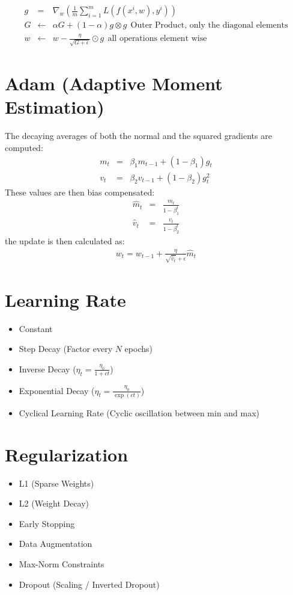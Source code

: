 \begin{eqnarray}
    g &=& \nabla_w \left( \frac{1}{m} \sum_{i=1}^m L(f(x^i, w), y^i) \right) \\
    G &\leftarrow& \alpha G + (1-\alpha) g \otimes g\ \ \text{Outer Product, only the diagonal elements} \\
    w &\leftarrow& w - \frac{\eta}{\sqrt{G + \epsilon}} \odot g\ \ \text{all operations element wise}
\end{eqnarray}

\section{Adam (Adaptive Moment Estimation)}
The decaying averages of both the normal and the squared gradients are computed:
\begin{eqnarray}
    m_t &=& \beta_1 m_{t-1} + (1- \beta_1) g_t \\
    v_t &=& \beta_2 v_{t-1} + (1- \beta_2) g_t^2
\end{eqnarray}
These values are then bias compensated:
\begin{eqnarray}
    \hat{m}_t &=& \frac{m_t}{1-\beta_1^t} \\
    \hat{v}_t &=& \frac{v_t}{1-\beta_2^t}
\end{eqnarray}
the update is then calculated as:
\begin{eqnarray}
    w_t = w_{t-1} + \frac{\eta}{\sqrt{\hat{v}_t} + \epsilon} \hat{m}_t
\end{eqnarray}

\section{Learning Rate}
\begin{itemize}
    \item Constant
    \item Step Decay (Factor every $N$ epochs)
    \item Inverse Decay ($\eta_t = \frac{\eta_0}{1 + c t}$)
    \item Exponential Decay ($\eta_t = \frac{\eta_0}{\exp(ct)}$)
    \item Cyclical Learning Rate (Cyclic oscillation between min and max)
\end{itemize}

\section{Regularization}
\begin{itemize}
    \item L1 (Sparse Weights)
    \item L2 (Weight Decay)
    \item Early Stopping
    \item Data Augmentation
    \item Max-Norm Constraints
    \item Dropout (Scaling / Inverted Dropout)
\end{itemize}

